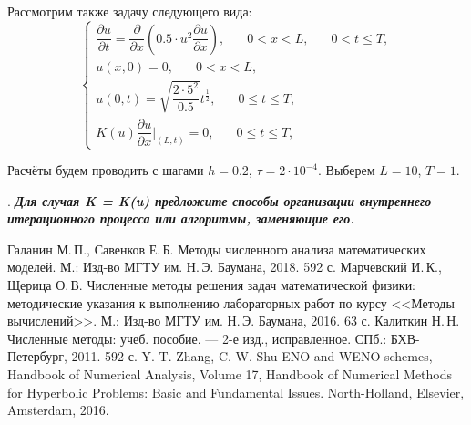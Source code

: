 \documentclass[12pt, a4paper]{article}
\newcounter{mycounter}
\newcommand{\quastion}[1]{%
	\stepcounter{mycounter}%
	\textbf{\themycounter}.  %
	\textbf{\textit{#1}}
	
}
\begin{document}
	Рассмотрим также задачу следующего вида:
		\[
	\begin{cases}
		\dfrac{\partial u}{\partial t} = \dfrac{\partial}{\partial x}\left(0.5\cdot u^2\dfrac{\partial u}{\partial x} \right), \phantom{xxx} 0<x<L, \phantom{xxx} 0<t\le T, \\
		u(x,0) = 0, \phantom{xxx} 0<x<L,\\
		u(0,t) = \sqrt{\dfrac{2\cdot5^2}{0.5}}t^{\frac12}, \phantom{xxx} 0 \le t \le T,\\
		K(u)\dfrac{\partial u}{\partial x}|_{(L,t)}=0, \phantom{xxx} 0 \le t \le T,
	\end{cases}
	\]
	
	Расчёты будем проводить с шагами $h=0.2$, $\tau=2\cdot 10^{-4}$. Выберем $L=10$, $T=1$.
	
	\clearpage %
	\quastion{Для случая K = K(u) предложите способы организации внутреннего итерационного процесса или алгоритмы, заменяющие его.}
	
	
	
	
	
	\clearpage
	\begin{thebibliography}{1}
		 Галанин М.\,П., Савенков Е.\,Б. Методы численного анализа математических моделей. М.: Изд-во МГТУ им. Н.\,Э. Баумана, 2018. 592 с.
		 Марчевский И.\,К., Щерица О.\,В. Численные методы решения задач математической физики: методические указания к выполнению лабораторных работ по курсу <<Методы вычислений>>. М.: Изд-во МГТУ им. Н.\,Э. Баумана, 2016. 63 с.
		 Калиткин Н.\,Н.
		Численные методы: учеб. пособие. —
		2-е изд., исправленное. СПб.: БХВ-Петербург, 2011. 
		592 с. 
		  Y.-T. Zhang, C.-W. Shu ENO and WENO schemes, Handbook of Numerical Analysis, Volume 17, Handbook of Numerical Methods for Hyperbolic Problems: Basic and Fundamental Issues. North-Holland, Elsevier, Amsterdam, 2016.
	\end{thebibliography}
	
\end{document}
